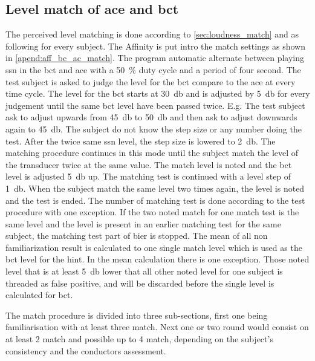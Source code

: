 \subsection{Level match of \gls{ace} and \gls{bct}}
The perceived level matching is done according to \autoref{sec:loudness_match} and as following for every subject. The Affinity is put intro the match settings as shown in \autoref{apend:aff_bc_ac_match}. The program automatic alternate between playing \gls{ssn} in the \gls{bct} and \gls{ace} with a \SI{50}{\percent} duty cycle and a period of four second. The test subject is asked to judge the level for the \gls{bct} compare to the \gls{ace} at every time cycle. The level for the \gls{bct} starts at \SI{30}{\decibel} and is adjusted by \SI{5}{\decibel} for every judgement until the same \gls{bct} level have been passed twice. E.g. The test subject ask to adjust upwards from \SI{45}{\decibel} to \SI{50}{\decibel} and then ask to adjust downwards again to \SI{45}{\decibel}. The subject do not know the step size or any number doing the test. After the twice same \gls{ssn} level, the step size is lowered to \SI{2}{\decibel}. The matching procedure continues in this mode until the subject match the level of the transducer twice at the same value. The match level is noted and the  \gls{bct} level is adjusted \SI{5}{\decibel} up. The matching test is continued with a level step of \SI{1}{\decibel}. When the subject match the same level two times again, the level is noted and the test is ended. The number of matching test is done according to the test procedure with one exception. If the two noted match for one match test is the same level and the level is present in an earlier matching test for the same subject, the matching test part of \gls{bier} is stopped. The mean of all non familiarization result is calculated to one single match level which is used as the \gls{bct} level for the \gls{hint}. In the mean calculation there is one exception. Those noted level that is at least \SI{5}{\decibel} lower that all other noted level for one subject is threaded as false positive, and will be discarded before the single level is calculated for \gls{bct}. 

The match procedure is divided into three sub-sections, first one being familiarisation with at least three match. Next one or two round would consist on at least 2 match and possible up to 4 match, depending on the subject's consistency and the conductors assessment. 


